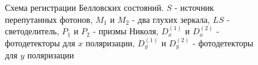 \begin{figure}
\centering


\caption{Схема регистрации Белловских состояний. $S$ - источник
  перепутанных фотонов, $M_1$ и $M_2$ - два глухих зеркала, $LS$ -
  светоделитель, $P_1$ и $P_2$ - призмы Николя, $D^{(1)}_x$ и
  $D^{(2)}_x$ - фотодетекторы для $x$ поляризации, $D^{(1)}_y$ и
  $D^{(2)}_y$ - фотодетекторы для $y$ поляризации}
\label{figBellReg2}
\end{figure}
